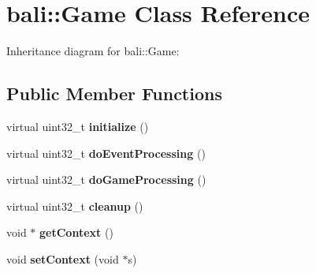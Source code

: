 \hypertarget{classbali_1_1_game}{\section{bali\-:\-:Game Class Reference}
\label{classbali_1_1_game}
}


Inheritance diagram for bali\-:\-:Game\-:
\subsection*{Public Member Functions}
\begin{DoxyCompactItemize}
\item 
\hypertarget{classbali_1_1_game_a6817ebb5e3e869f6118ac358b3ad4981}{virtual uint32\-\_\-t {\bfseries initialize} ()}\label{classbali_1_1_game_a6817ebb5e3e869f6118ac358b3ad4981}

\item 
\hypertarget{classbali_1_1_game_ad08d60dec92b0f566824f5991617a64e}{virtual uint32\-\_\-t {\bfseries do\-Event\-Processing} ()}\label{classbali_1_1_game_ad08d60dec92b0f566824f5991617a64e}

\item 
\hypertarget{classbali_1_1_game_a9b1bf4efe2137470e8b9ad062c6bdb0b}{virtual uint32\-\_\-t {\bfseries do\-Game\-Processing} ()}\label{classbali_1_1_game_a9b1bf4efe2137470e8b9ad062c6bdb0b}

\item 
\hypertarget{classbali_1_1_game_a5df2ed432848963f6297036aaf053bcc}{virtual uint32\-\_\-t {\bfseries cleanup} ()}\label{classbali_1_1_game_a5df2ed432848963f6297036aaf053bcc}

\item 
\hypertarget{classbali_1_1_game_a6cb324232ac96f38a11f50e496e802cb}{void $\ast$ {\bfseries get\-Context} ()}\label{classbali_1_1_game_a6cb324232ac96f38a11f50e496e802cb}

\item 
\hypertarget{classbali_1_1_game_a19e86c4c58a3510bcb7c88ae67240061}{void {\bfseries set\-Context} (void $\ast$s)}\label{classbali_1_1_game_a19e86c4c58a3510bcb7c88ae67240061}

\end{DoxyCompactItemize}
